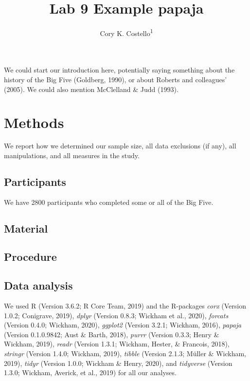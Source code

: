 \documentclass[
  man,floatsintext]{apa6}
\affiliation{
\vspace{0.5cm}
\textsuperscript{1} University of Oregon}
\title{Lab 9 Example papaja}
\author{Cory K. Costello\textsuperscript{1}}
\date{}
\begin{document}
\maketitle

We could start our introduction here, potentially saying something about the history of the Big Five (Goldberg, 1990), or about Roberts and colleagues' (2005). We could also mention McClelland \& Judd (1993).

\hypertarget{methods}{%
\section{Methods}\label{methods}}

We report how we determined our sample size, all data exclusions (if any), all manipulations, and all measures in the study.

\hypertarget{participants}{%
\subsection{Participants}\label{participants}}

We have 2800 participants who completed some or all of the Big Five.

\hypertarget{material}{%
\subsection{Material}\label{material}}

\hypertarget{procedure}{%
\subsection{Procedure}\label{procedure}}

\hypertarget{data-analysis}{%
\subsection{Data analysis}\label{data-analysis}}

We used R (Version 3.6.2; R Core Team, 2019) and the R-packages \emph{corx} (Version 1.0.2; Conigrave, 2019), \emph{dplyr} (Version 0.8.3; Wickham et al., 2020), \emph{forcats} (Version 0.4.0; Wickham, 2020), \emph{ggplot2} (Version 3.2.1; Wickham, 2016), \emph{papaja} (Version 0.1.0.9842; Aust \& Barth, 2018), \emph{purrr} (Version 0.3.3; Henry \& Wickham, 2019), \emph{readr} (Version 1.3.1; Wickham, Hester, \& Francois, 2018), \emph{stringr} (Version 1.4.0; Wickham, 2019), \emph{tibble} (Version 2.1.3; Müller \& Wickham, 2019), \emph{tidyr} (Version 1.0.0; Wickham \& Henry, 2020), and \emph{tidyverse} (Version 1.3.0; Wickham, Averick, et al., 2019) for all our analyses.
\end{document}
